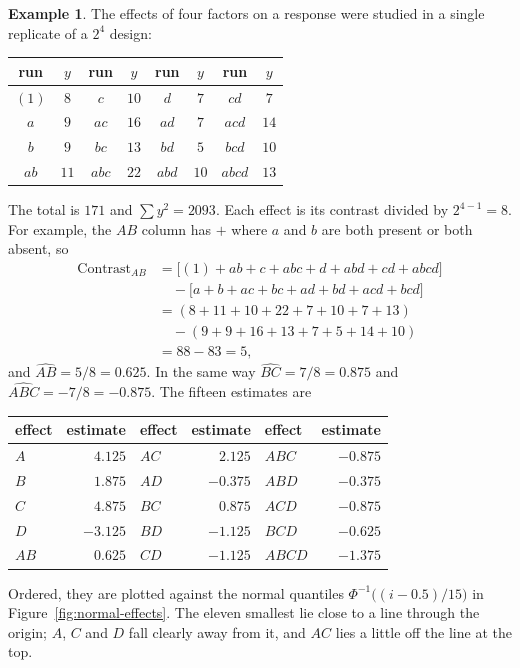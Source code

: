 \documentclass[11pt,a4paper]{article}
\numberwithin{equation}{section}
\theoremstyle{definition}
\newtheorem{exa}[thm]{Example}
\begin{document}
\begin{exa}\label{exa:twofour}
The effects of four factors on a response were studied in a single replicate of a $2^4$ design:
\begin{center}
\begin{tabular}{cc|cc|cc|cc}
run & $y$ & run & $y$ & run & $y$ & run & $y$ \\
\hline
$(1)$ & $8$ & $c$ & $10$ & $d$ & $7$ & $cd$ & $7$ \\
$a$ & $9$ & $ac$ & $16$ & $ad$ & $7$ & $acd$ & $14$ \\
$b$ & $9$ & $bc$ & $13$ & $bd$ & $5$ & $bcd$ & $10$ \\
$ab$ & $11$ & $abc$ & $22$ & $abd$ & $10$ & $abcd$ & $13$
\end{tabular}
\end{center}
The total is $171$ and $\sum y^2 = 2093$. Each effect is its contrast divided by $2^{4-1} = 8$. For example, the $AB$ column has $+$ where $a$ and $b$ are both present or
both absent, so
\begin{align*}
\text{Contrast}_{AB} &= \bigl[(1) + ab + c + abc + d + abd + cd + abcd\bigr] \\
&\quad - \bigl[a + b + ac + bc + ad + bd + acd + bcd\bigr] \\
&= (8 + 11 + 10 + 22 + 7 + 10 + 7 + 13) \\
&\quad - (9 + 9 + 16 + 13 + 7 + 5 + 14 + 10) \\
&= 88 - 83 = 5 ,
\end{align*}
and $\widehat{AB} = 5/8 = 0.625$. In the same way $\widehat{BC} = 7/8 = 0.875$ and $\widehat{ABC} = -7/8 = -0.875$. The fifteen estimates are
\begin{center}
\begin{tabular}{lr|lr|lr}
effect & estimate & effect & estimate & effect & estimate \\
\hline
$A$ & $4.125$ & $AC$ & $2.125$ & $ABC$ & $-0.875$ \\
$B$ & $1.875$ & $AD$ & $-0.375$ & $ABD$ & $-0.375$ \\
$C$ & $4.875$ & $BC$ & $0.875$ & $ACD$ & $-0.875$ \\
$D$ & $-3.125$ & $BD$ & $-1.125$ & $BCD$ & $-0.625$ \\
$AB$ & $0.625$ & $CD$ & $-1.125$ & $ABCD$ & $-1.375$
\end{tabular}
\end{center}
Ordered, they are plotted against the normal quantiles $\Phi^{-1}\bigl((i - 0.5)/15\bigr)$ in Figure~\ref{fig:normal-effects}. The eleven smallest lie close to a line through
the origin; $A$, $C$ and $D$ fall clearly away from it, and $AC$ lies a little off the line at the top.
\end{exa}
\end{document}
